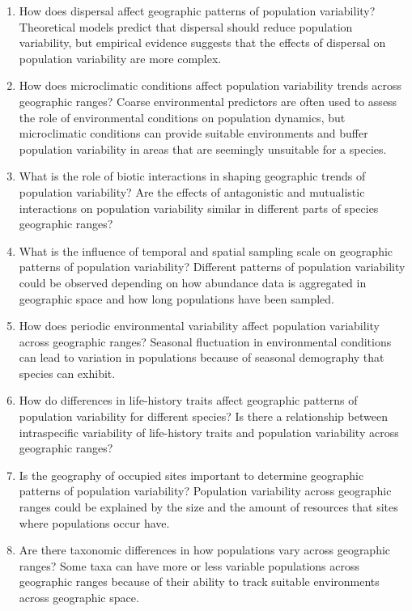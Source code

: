 \begin{enumerate}
\item How does dispersal affect geographic patterns of population variability? Theoretical models predict that dispersal should reduce population variability, but empirical evidence suggests that the effects of dispersal on population variability are more complex.
\item How does microclimatic conditions affect population variability trends across geographic ranges? Coarse environmental predictors are often used to assess the role of environmental conditions on population dynamics, but microclimatic conditions can provide suitable environments and buffer population variability in areas that are seemingly unsuitable for a species.   
\item What is the role of biotic interactions in shaping geographic trends of population variability? Are the effects of antagonistic and mutualistic interactions on population variability similar in different parts of species geographic ranges?
\item What is the influence of temporal and spatial sampling scale on geographic patterns of population variability? Different patterns of population variability could be observed depending on how abundance data is aggregated in geographic space and how long populations have been sampled. 
\item How does periodic environmental variability affect population variability across geographic ranges? Seasonal fluctuation in environmental conditions can lead to variation in populations because of seasonal demography that species can exhibit.  
\item How do differences in life-history traits affect geographic patterns of population variability for different species? Is there a relationship between intraspecific variability of life-history traits and population variability across geographic ranges?
\item Is the geography of occupied sites important to determine geographic patterns of population variability? Population variability across geographic ranges could be explained by the size and the amount of resources that sites where populations occur have. 
\item Are there taxonomic differences in how populations vary across geographic ranges? Some taxa can have more or less variable populations across geographic ranges because of their ability to track suitable environments across geographic space. 

\end{enumerate}
